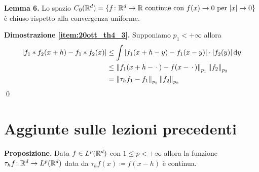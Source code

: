 \documentclass[a4paper, 12pt]{report}
\begin{document}
\textbf{Lemma 6.}
Lo spazio $C_0(\mathbb R^d) = \{ f \colon \mathbb R^d \to \mathbb R \text{ continue con } f(x) \to 0 \text{ per } |x| \to 0 \}$ è chiuso rispetto alla convergenza uniforme.

\textbf{Dimostrazione \ref{item:20ott_th4_3}.} 
Supponiamo $p_1 < +\infty$ allora
$$
\begin{aligned}
	|f_1 \ast f_2(x + h) - f_1 \ast f_2(x)|
	&\leq \int |f_1(x + h - y) - f_1(x - y)| \cdot |f_2(y)| \,\mathrm{d} y \\
	&\leq \left\lVert f_1(x + h - \,\cdot\,) - f(x - \,\cdot\,) \right\rVert_{p_1} \left\lVert f_2 \right\rVert_{p_2} \\
	&= \left\lVert \tau_h f_1 - f_1 \right\rVert_{p_2} \left\lVert f_2 \right\rVert_{p_2}
\end{aligned}
$$
\qed

%
%

\section{Aggiunte sulle lezioni precedenti}

\textbf{Proposizione.}
Data $f \in L^p(\mathbb R^d)$ con $1 \leq p < +\infty$ allora la funzione $\tau_h f \colon \mathbb R^d \to L^p(\mathbb R^d)$ data da $\tau_h f(x) \coloneqq f(x - h)$ è continua.
\end{document}
